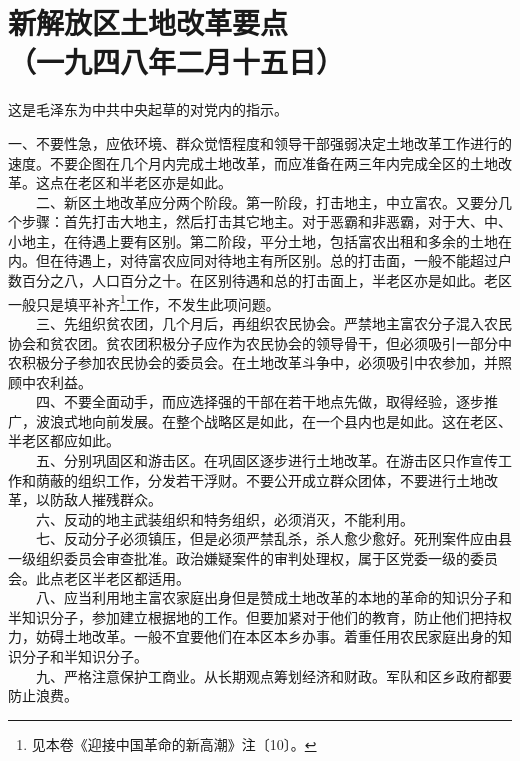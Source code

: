 \documentclass[cn,11pt,chinese]{elegantbook}
\def\myformat#1{\hfil\hfil #1}
\begin{document}
\newpage\section*{\myformat{新解放区土地改革要点}\\\myformat{（一九四八年二月十五日）}}
\begin{introduction}\item  这是毛泽东为中共中央起草的对党内的指示。\end{introduction}
一、不要性急，应依环境、群众觉悟程度和领导干部强弱决定土地改革工作进行的速度。不要企图在几个月内完成土地改革，而应准备在两三年内完成全区的土地改革。这点在老区和半老区亦是如此。\\
　　二、新区土地改革应分两个阶段。第一阶段，打击地主，中立富农。又要分几个步骤：首先打击大地主，然后打击其它地主。对于恶霸和非恶霸，对于大、中、小地主，在待遇上要有区别。第二阶段，平分土地，包括富农出租和多余的土地在内。但在待遇上，对待富农应同对待地主有所区别。总的打击面，一般不能超过户数百分之八，人口百分之十。在区别待遇和总的打击面上，半老区亦是如此。老区一般只是填平补齐\footnote[1]{ 见本卷《迎接中国革命的新高潮》注〔10〕。}工作，不发生此项问题。\\
　　三、先组织贫农团，几个月后，再组织农民协会。严禁地主富农分子混入农民协会和贫农团。贫农团积极分子应作为农民协会的领导骨干，但必须吸引一部分中农积极分子参加农民协会的委员会。在土地改革斗争中，必须吸引中农参加，并照顾中农利益。\\
　　四、不要全面动手，而应选择强的干部在若干地点先做，取得经验，逐步推广，波浪式地向前发展。在整个战略区是如此，在一个县内也是如此。这在老区、半老区都应如此。\\
　　五、分别巩固区和游击区。在巩固区逐步进行土地改革。在游击区只作宣传工作和荫蔽的组织工作，分发若干浮财。不要公开成立群众团体，不要进行土地改革，以防敌人摧残群众。\\
　　六、反动的地主武装组织和特务组织，必须消灭，不能利用。\\
　　七、反动分子必须镇压，但是必须严禁乱杀，杀人愈少愈好。死刑案件应由县一级组织委员会审查批准。政治嫌疑案件的审判处理权，属于区党委一级的委员会。此点老区半老区都适用。\\
　　八、应当利用地主富农家庭出身但是赞成土地改革的本地的革命的知识分子和半知识分子，参加建立根据地的工作。但要加紧对于他们的教育，防止他们把持权力，妨碍土地改革。一般不宜要他们在本区本乡办事。着重任用农民家庭出身的知识分子和半知识分子。\\
　　九、严格注意保护工商业。从长期观点筹划经济和财政。军队和区乡政府都要防止浪费。\\
\end{document}

